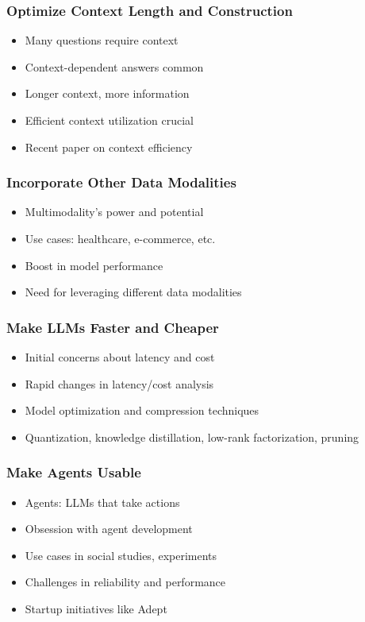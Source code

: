 \begin{frame}[fragile]
  \frametitle{Optimize Context Length and Construction}
  \begin{itemize}
    \item Many questions require context
    \item Context-dependent answers common
    \item Longer context, more information
    \item Efficient context utilization crucial
    \item Recent paper on context efficiency
  \end{itemize}
\end{frame}

\begin{frame}[fragile]
  \frametitle{Incorporate Other Data Modalities}
  \begin{itemize}
    \item Multimodality's power and potential
    \item Use cases: healthcare, e-commerce, etc.
    \item Boost in model performance
    \item Need for leveraging different data modalities
  \end{itemize}
\end{frame}

\begin{frame}[fragile]
  \frametitle{Make LLMs Faster and Cheaper}
  \begin{itemize}
    \item Initial concerns about latency and cost
    \item Rapid changes in latency/cost analysis
    \item Model optimization and compression techniques
    \item Quantization, knowledge distillation, low-rank factorization, pruning
  \end{itemize}
\end{frame}

\begin{frame}[fragile]
  \frametitle{Make Agents Usable}
  \begin{itemize}
    \item Agents: LLMs that take actions
    \item Obsession with agent development
    \item Use cases in social studies, experiments
    \item Challenges in reliability and performance
    \item Startup initiatives like Adept
  \end{itemize}
\end{frame}

